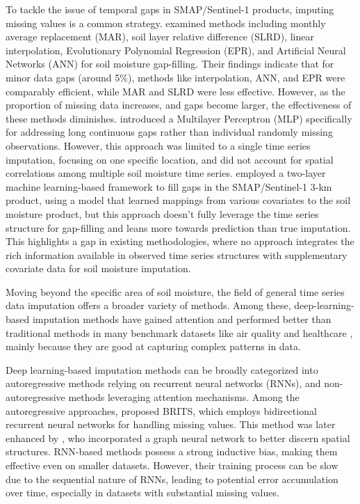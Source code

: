 \documentclass[11pt]{article}
\begin{document}
To tackle the issue of temporal gaps in SMAP/Sentinel-1 products, imputing missing values is a common strategy. \citet{kornelsen2014comparison} examined methods including monthly average replacement (MAR), soil layer relative difference (SLRD), linear interpolation, Evolutionary Polynomial Regression (EPR), and Artificial Neural Networks (ANN) for soil moisture gap-filling. Their findings indicate that for minor data gaps (around 5\%), methods like interpolation, ANN, and EPR were comparably efficient, while MAR and SLRD were less effective. However, as the proportion of missing data increases, and gaps become larger, the effectiveness of these methods diminishes. \cite{park2023long} introduced a Multilayer Perceptron (MLP) specifically for addressing long continuous gaps rather than individual randomly missing observations. However, this approach was limited to a single time series imputation, focusing on one specific location, and did not account for spatial correlations among multiple soil moisture time series. \citet{mao2019gap} employed a two-layer machine learning-based framework to fill gaps in the SMAP/Sentinel-1 3-km product, using a model that learned mappings from various covariates to the soil moisture product, but this approach doesn't fully leverage the time series structure for gap-filling and leans more towards prediction than true imputation. This highlights a  gap in existing methodologies, where no approach integrates the rich information available in observed time series structures with supplementary covariate data for soil moisture imputation.

Moving beyond the specific area of soil moisture, the field of general time series data imputation offers a broader variety of methods. Among these, deep-learning-based imputation methods have gained attention and performed better than traditional methods in many benchmark datasets like air quality \citep{yi2016st} and healthcare \citep{silva2012predicting}, mainly because they are good at capturing complex patterns in data. 

Deep learning-based imputation methods can be broadly categorized into autoregressive methods relying on recurrent neural networks (RNNs), and non-autoregressive methods leveraging attention mechanisms. Among the autoregressive approaches, \citet{cao2018brits} proposed BRITS, which employs bidirectional recurrent neural networks for handling missing values. This method was later enhanced by \citet{cini2021filling}, who incorporated a graph neural network to better discern spatial structures. RNN-based methods possess a strong inductive bias, making them effective even on smaller datasets. However, their training process can be slow due to the sequential nature of RNNs, leading to potential error accumulation over time, especially in datasets with substantial missing values.
\end{document}
